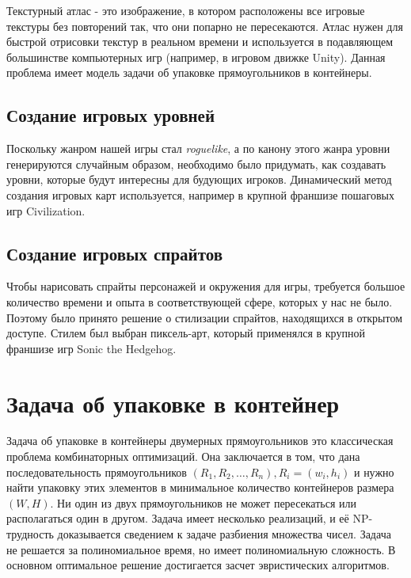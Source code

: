\documentclass[a4paper,12pt]{report}
\begin{document}
Текстурный атлас - это изображение, в котором расположены все игровые текстуры без повторений так, что они попарно не пересекаются. Атлас нужен для быстрой отрисовки текстур в реальном времени и используется в подавляющем большинстве компьютерных игр (например, в игровом движке Unity\citep{unity}). Данная проблема имеет модель задачи об упаковке прямоугольников в контейнеры.

\section{Создание игровых уровней}

Поскольку жанром нашей игры стал \textit{roguelike}, а по канону этого жанра уровни генерируются случайным образом, необходимо было придумать, как создавать уровни, которые будут интересны для будующих игроков. Динамический метод создания игровых карт используется, например в крупной франшизе пошаговых игр Civilization\citep{civi}.

\section{Создание игровых спрайтов}

Чтобы нарисовать спрайты персонажей и окружения для игры, требуется большое количество времени и опыта в соответствующей сфере, которых у нас не было. Поэтому было принято решение о стилизации спрайтов, находящихся в открытом доступе. Стилем был выбран пиксель-арт, который применялся в крупной франшизе игр Sonic the Hedgehog\citep{sonic}.

\chapter{Задача об упаковке в контейнер} 

\parindent=1cm
Задача об упаковке в контейнеры \citep{Jylanki} двумерных прямоугольников это классическая проблема комбинаторных оптимизаций. Она заключается в том, что дана последовательность прямоугольников $(R_1, R_2, …, R_n), R_i = (w_i, h_i)$ и нужно найти упаковку этих элементов в минимальное количество контейнеров размера $(W, H)$. Ни один из двух прямоугольников не может пересекаться или располагаться один в другом. Задача имеет несколько реализаций, и её NP-трудность доказывается сведением к задаче разбиения множества чисел. Задача не решается за полиномиальное время, но имеет полиномиальную сложность. В основном оптимальное решение достигается засчет эвристических алгоритмов.
\end{document}
